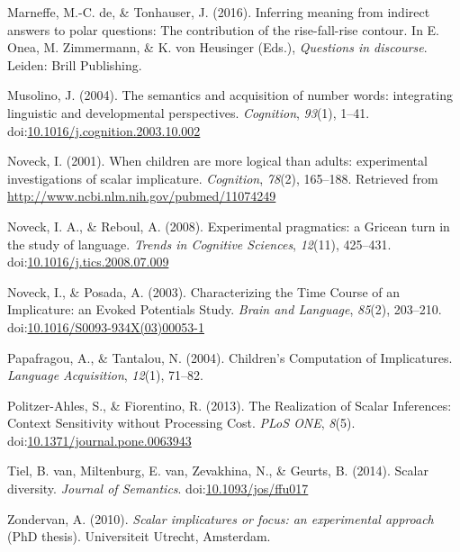\documentclass[floatsintext,man]{apa6}
\theoremstyle{definition}
\theoremstyle{definition}
\theoremstyle{definition}
\theoremstyle{remark}
\begin{document}
\hypertarget{ref-DeMarneffe2017}{}
Marneffe, M.-C. de, \& Tonhauser, J. (2016). Inferring meaning from
indirect answers to polar questions: The contribution of the
rise-fall-rise contour. In E. Onea, M. Zimmermann, \& K. von Heusinger
(Eds.), \emph{Questions in discourse}. Leiden: Brill Publishing.

\hypertarget{ref-Musolino2004}{}
Musolino, J. (2004). The semantics and acquisition of number words:
integrating linguistic and developmental perspectives. \emph{Cognition},
\emph{93}(1), 1--41.
doi:\href{https://doi.org/10.1016/j.cognition.2003.10.002}{10.1016/j.cognition.2003.10.002}

\hypertarget{ref-Noveck2001}{}
Noveck, I. (2001). When children are more logical than adults:
experimental investigations of scalar implicature. \emph{Cognition},
\emph{78}(2), 165--188. Retrieved from
\url{http://www.ncbi.nlm.nih.gov/pubmed/11074249}

\hypertarget{ref-noveck2008}{}
Noveck, I. A., \& Reboul, A. (2008). Experimental pragmatics: a Gricean
turn in the study of language. \emph{Trends in Cognitive Sciences},
\emph{12}(11), 425--431.
doi:\href{https://doi.org/10.1016/j.tics.2008.07.009}{10.1016/j.tics.2008.07.009}

\hypertarget{ref-Noveck2003}{}
Noveck, I., \& Posada, A. (2003). Characterizing the Time Course of an
Implicature: an Evoked Potentials Study. \emph{Brain and Language},
\emph{85}(2), 203--210.
doi:\href{https://doi.org/10.1016/S0093-934X(03)00053-1}{10.1016/S0093-934X(03)00053-1}

\hypertarget{ref-Papafragou2004}{}
Papafragou, A., \& Tantalou, N. (2004). Children's Computation of
Implicatures. \emph{Language Acquisition}, \emph{12}(1), 71--82.

\hypertarget{ref-Politzer-Ahles2013}{}
Politzer-Ahles, S., \& Fiorentino, R. (2013). The Realization of Scalar
Inferences: Context Sensitivity without Processing Cost. \emph{PLoS
ONE}, \emph{8}(5).
doi:\href{https://doi.org/10.1371/journal.pone.0063943}{10.1371/journal.pone.0063943}

\hypertarget{ref-VanTiel2014}{}
Tiel, B. van, Miltenburg, E. van, Zevakhina, N., \& Geurts, B. (2014).
Scalar diversity. \emph{Journal of Semantics}.
doi:\href{https://doi.org/10.1093/jos/ffu017}{10.1093/jos/ffu017}

\hypertarget{ref-Zondervan2010}{}
Zondervan, A. (2010). \emph{Scalar implicatures or focus: an
experimental approach} (PhD thesis). Universiteit Utrecht, Amsterdam.
\end{document}
